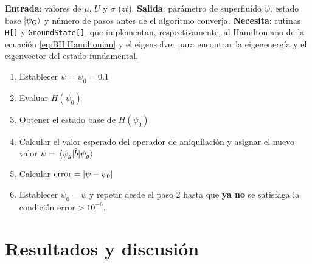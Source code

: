 \documentclass[11pt,letterpaper]{article}
\begin{document}
\textbf{Entrada}: valores de $\mu$, $U$ y $\sigma$ ($zt$). 
\textbf{Salida}: parámetro de superfluído
$\psi$, estado base $\ket{\psi_G}$ y número de pasos antes de el 
algoritmo converja.
\textbf{Necesita}: rutinas \texttt{H[]} y \texttt{GroundState[]},
que implementan, respectivamente, al Hamiltoniano de la ecuación 
\eqref{eq:BH:Hamiltonian} y el eigensolver para encontrar la eigenenergía y 
el eigenvector del estado fundamental.
\begin{enumerate}
\item Establecer $\psi=\psi_0=0.1$
\item Evaluar $H(\psi_0)$
\item Obtener el estado base de $H(\psi_0)$
\item Calcular el valor esperado del operador de aniquilación
y asignar el nuevo valor $\psi=\matrixel{\psi_g}{\hat b}{\psi_g}$
\item Calcular $\text{error}=\abs{\psi-\psi_0}$
\item Establecer $\psi_0=\psi$ y repetir desde el paso 2 hasta que \textbf{ya
no} se satisfaga la condición $\text{error}>10^{-6}$.
\end{enumerate}


\section{Resultados y discusión}
\end{document}

